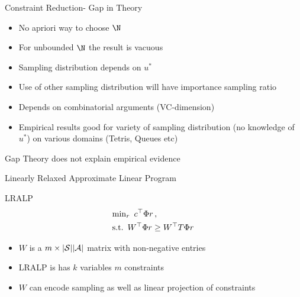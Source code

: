 \documentclass[10pt,handout]{beamer}
\begin{document}
\begin{frame}[fragile]{Constraint Reduction- Gap in Theory}
\begin{block}{\cite{de2004constraint}}
\begin{itemize}
\item No apriori way to choose $\N$
\item For unbounded $\N$ the result is vacuous
\item Sampling distribution depends on $u^*$
\item Use of other sampling distribution will have importance sampling ratio
\item Depends on combinatorial arguments (VC-dimension)
\item \cite{farias2006tetris,de2003linear,de2004constraint} Empirical results good for variety of sampling distribution (no knowledge of $u^*$) on various domains (Tetris, Queues etc)
\end{itemize}
\end{block}
\begin{block}{Gap}
Theory does not explain empirical evidence
\end{block}
\end{frame}

\begin{frame}[fragile]{Linearly Relaxed Approximate Linear Program}
\begin{block}{LRALP}
\begin{align*}
&{\min}_r \,\mbox{ } c^\top \Phi r\,,\\
&\text{s.t.} \,\,\, W^\top  \Phi r\geq W^\top T \Phi r\,\\
\end{align*}
\end{block}
\begin{itemize}
\item $W$ is a $m\times |\mathcal{S}||\mathcal{A}|$ matrix with non-negative entries
\item LRALP is has $k$ variables $m$ constraints
\item $W$ can encode sampling as well as linear projection of constraints
\end{itemize}
\end{frame}
\end{document}
